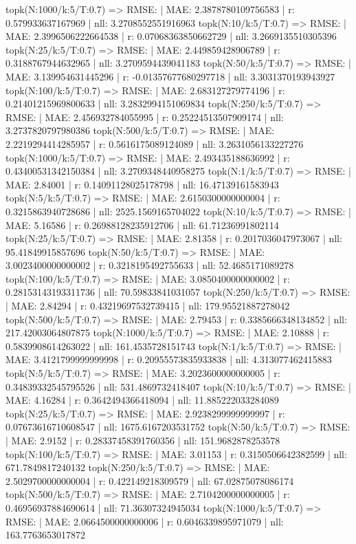 topk(N:1000/k:5/T:0.7) => RMSE: | MAE: 2.3878780109756583 | r: 0.579933637167969 | nll: 3.2708552551916963
topk(N:10/k:5/T:0.7) => RMSE: | MAE: 2.3996506222664538 | r: 0.07068363850662729 | nll: 3.2669135510305396
topk(N:25/k:5/T:0.7) => RMSE: | MAE: 2.449859428906789 | r: 0.3188767944632965 | nll: 3.2709594439041183
topk(N:50/k:5/T:0.7) => RMSE: | MAE: 3.139954631445296 | r: -0.01357677680297718 | nll: 3.3031370193943927
topk(N:100/k:5/T:0.7) => RMSE: | MAE: 2.683127279774196 | r: 0.21401215969800633 | nll: 3.2832994151069834
topk(N:250/k:5/T:0.7) => RMSE: | MAE: 2.456932784055995 | r: 0.25224513507909174 | nll: 3.2737820797980386
topk(N:500/k:5/T:0.7) => RMSE: | MAE: 2.2219294414285957 | r: 0.5616175089124089 | nll: 3.2631056133227276
topk(N:1000/k:5/T:0.7) => RMSE: | MAE: 2.493435188636992 | r: 0.43400531342150384 | nll: 3.2709348440958275
topk(N:1/k:5/T:0.7) => RMSE: | MAE: 2.84001 | r: 0.14091128025178798 | nll: 16.47139161583943
topk(N:5/k:5/T:0.7) => RMSE: | MAE: 2.6150300000000004 | r: 0.3215863940728686 | nll: 2525.1569165704022
topk(N:10/k:5/T:0.7) => RMSE: | MAE: 5.16586 | r: 0.26988128235912706 | nll: 61.71236991802114
topk(N:25/k:5/T:0.7) => RMSE: | MAE: 2.81358 | r: 0.2017036047973067 | nll: 95.41849915857696
topk(N:50/k:5/T:0.7) => RMSE: | MAE: 3.0023400000000002 | r: 0.3218195492755633 | nll: 52.4685171089278
topk(N:100/k:5/T:0.7) => RMSE: | MAE: 3.0850400000000002 | r: 0.28153143193311736 | nll: 70.59833841031057
topk(N:250/k:5/T:0.7) => RMSE: | MAE: 2.84294 | r: 0.43219697532739415 | nll: 179.95521887278042
topk(N:500/k:5/T:0.7) => RMSE: | MAE: 2.79453 | r: 0.3385666348134852 | nll: 217.42003064807875
topk(N:1000/k:5/T:0.7) => RMSE: | MAE: 2.10888 | r: 0.5839908614263022 | nll: 161.4535728151743
topk(N:1/k:5/T:0.7) => RMSE: | MAE: 3.4121799999999998 | r: 0.20955573835933838 | nll: 4.313077462415883
topk(N:5/k:5/T:0.7) => RMSE: | MAE: 3.2023600000000005 | r: 0.34839332545795526 | nll: 531.4869732418407
topk(N:10/k:5/T:0.7) => RMSE: | MAE: 4.16284 | r: 0.3642494366418094 | nll: 11.885222033284089
topk(N:25/k:5/T:0.7) => RMSE: | MAE: 2.9238299999999997 | r: 0.07673616710608547 | nll: 1675.6167203531752
topk(N:50/k:5/T:0.7) => RMSE: | MAE: 2.9152 | r: 0.28337458391760356 | nll: 151.9682878253578
topk(N:100/k:5/T:0.7) => RMSE: | MAE: 3.01153 | r: 0.3150506642382599 | nll: 671.7849817240132
topk(N:250/k:5/T:0.7) => RMSE: | MAE: 2.5029700000000004 | r: 0.422149218309579 | nll: 67.02875078086174
topk(N:500/k:5/T:0.7) => RMSE: | MAE: 2.7104200000000005 | r: 0.46956937884690614 | nll: 71.36307324945034
topk(N:1000/k:5/T:0.7) => RMSE: | MAE: 2.0664500000000006 | r: 0.6046339895971079 | nll: 163.7763653017872
